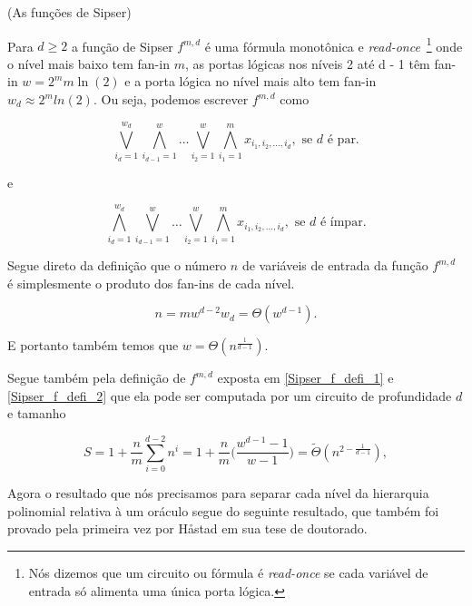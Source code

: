 \begin{defi} (As funções de Sipser) \label{Sipser_f}

Para $d \geq 2$ a função de Sipser $f^{m, d}$ é uma fórmula monotônica e \emph{read-once}~\footnote{Nós dizemos que um circuito ou fórmula é \emph{read-once} se cada variável de entrada só alimenta uma única porta lógica.} onde o nível mais baixo tem fan-in $m$, as portas lógicas nos níveis 2 até d - 1 têm fan-in $w = 2^{m}m \ln(2)$ e a porta lógica no nível mais alto tem fan-in $w_{d} \approx 2^{m} ln(2)$. Ou seja, podemos escrever $f^{m, d}$ como

\begin{equation} \label{Sipser_f_defi_1}
	\bigvee_{i_{d}  = 1}^{w_{d}}\bigwedge_{i_{d - 1} = 1}^{w} \dots \bigvee_{i_{2} = 1}^{w} \bigwedge_{i_{1} = 1}^{m} x_{i_{1}, i_{2}, \dots, i_{d}}, \text{ se } d \text{ é par.}
\end{equation}

e

\begin{equation} \label{Sipser_f_defi_2}
	\bigwedge_{i_{d}  = 1}^{w_{d}}\bigvee_{i_{d - 1} = 1}^{w} \dots \bigvee_{i_{2} = 1}^{w} \bigwedge_{i_{1} = 1}^{m} x_{i_{1}, i_{2}, \dots, i_{d}}, \text{ se } d \text{ é ímpar.}
\end{equation}

\end{defi}

Segue direto da definição que o número $n$ de variáveis de entrada da função $f^{m, d}$ é simplesmente o produto dos fan-ins de cada nível.

\begin{equation*}
	n = mw^{d - 2}w_{d} = \Theta(w^{d - 1}).
\end{equation*}

E portanto também temos que $w = \Theta(n^{\frac{1}{d - 1}})$.

Segue também pela definição de $f^{m, d}$ exposta em \ref{Sipser_f_defi_1} e \ref{Sipser_f_defi_2} que ela pode ser computada por um circuito de profundidade $d$ e tamanho

\begin{equation*}
	S = 1 + \frac{n}{m}\sum_{i = 0}^{d - 2} n^{i} = 1 + \frac{n}{m}\Big(\frac{w^{d - 1} - 1}{w - 1}\Big) = \widetilde{\Theta}(n^{2 - \frac{1}{d - 1}}),
\end{equation*}

Agora o resultado que nós precisamos para separar cada nível da hierarquia polinomial relativa à um oráculo segue do seguinte resultado, que também foi provado pela primeira vez por Håstad em sua tese de doutorado.

